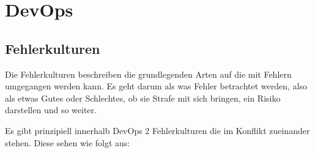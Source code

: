 \chapter{DevOps}



\section{Fehlerkulturen \cite{spektrum2}}\label{chap:fehler}

Die Fehlerkulturen beschreiben die grundlegenden Arten auf die mit Fehlern umgegangen werden kann. Es geht darum als was Fehler betrachtet werden, also als etwas Gutes oder Schlechtes, ob sie Strafe mit sich bringen, ein Risiko darstellen und so weiter.

Es gibt prinzipiell innerhalb \ac{DevOps} 2 Fehlerkulturen die im Konflikt zueinander stehen. Diese sehen wie folgt aus:

